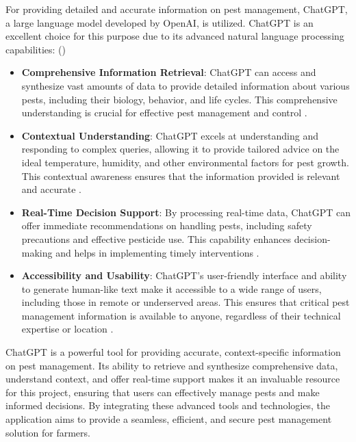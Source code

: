 For providing detailed and accurate information on pest management, ChatGPT, a large language model developed by OpenAI, is utilized. ChatGPT is an excellent choice for this purpose due to its advanced natural language processing capabilities: (\cite{ray_2023_chatgpt})

\begin{itemize}
\item \textbf{Comprehensive Information Retrieval}: ChatGPT can access and synthesize vast amounts of data to provide detailed information about various pests, including their biology, behavior, and life cycles. This comprehensive understanding is crucial for effective pest management and control .
\item \textbf{Contextual Understanding}: ChatGPT excels at understanding and responding to complex queries, allowing it to provide tailored advice on the ideal temperature, humidity, and other environmental factors for pest growth. This contextual awareness ensures that the information provided is relevant and accurate .
\item \textbf{Real-Time Decision Support}: By processing real-time data, ChatGPT can offer immediate recommendations on handling pests, including safety precautions and effective pesticide use. This capability enhances decision-making and helps in implementing timely interventions .
\item \textbf{Accessibility and Usability}: ChatGPT’s user-friendly interface and ability to generate human-like text make it accessible to a wide range of users, including those in remote or underserved areas. This ensures that critical pest management information is available to anyone, regardless of their technical expertise or location .
\end{itemize}
ChatGPT is a powerful tool for providing accurate, context-specific information on pest management. Its ability to retrieve and synthesize comprehensive data, understand context, and offer real-time support makes it an invaluable resource for this project, ensuring that users can effectively manage pests and make informed decisions. By integrating these advanced tools and technologies, the application aims to provide a seamless, efficient, and secure pest management solution for farmers. 
